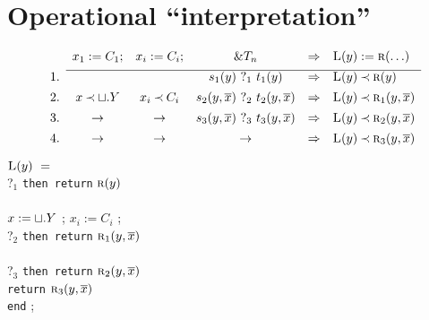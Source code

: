 \documentclass[leqno]{article}
\newcommand{\ky}[1]{{\tt #1}}
\newcommand{\ina}{\hspace*{1em}}
\newcommand{\inb}{\hspace*{2em}}
\newcommand{\inc}{\hspace*{3.5em}}
\newcommand{\func}[1]{\mbox{\sc #1}}
\newcommand{\f}[1]{\func{#1}}
\newcommand{\ret}{\mbox{$\ \rightarrow\ $}}
\begin{document}
\newpage\section{Operational ``interpretation''}
{\large{
\[\begin{array}{rccccl}
& x_1:=C_1; & x_i:=C_i; & \&T_n & \impl & \f L(y) := \f r(\ldots) \\[1ex] \cline{2-6}
1.&  & & s_1(y)\ \mbox{?}_1\ t_1(y) & \impl & \f L(y) \Incl \f r(y) \\[1ex]
2.& x\Incl\ch.Y &x_i\Incl C_i &s_2(y,\ovr x)\ \mbox{?}_2\ t_2(y,\ovr x) 
    &\impl &\f L(y)\Incl \f r_1(y,\ovr x)\\[1ex]
3.& \ret & \ret &s_3(y,\ovr x)\ \mbox{?}_3\ t_3(y,\ovr x)
    &\impl &\f L(y)\Incl \f r_2(y,\ovr x)\\[1ex]
4.& \ret & \ret & \ret &\impl &\f L(y)\Incl \f r_3(y,\ovr x) 
\end{array}
\] }}

\noindent
\hspace*{4em}
$\f L(y)\ =$ \\  \hspace*{4em}
\ina\ky{if} ?$_1$ \ky{then return} $\f r(y)$ \\  \hspace*{4em}
\ina\ky{else} \\  \hspace*{4em}
\inb $x:=\sqcup.Y$ ; \ina $x_i:= C_i$ ; \\  \hspace*{4em}
\inb\ky{if} ?$_2$ \ky{then return} $\f r_1(y,\ovr x)$ \\  \hspace*{4em}
\inb\ky{else} \\ \hspace*{4em}
 \inc\ky{if} ?$_3$ \ky{then return} $\f r_2(y,\ovr x)$ \\  \hspace*{4em}
 \inc\ky{else} \ky{return} $\f r_3(y,\ovr x)$ \\  \hspace*{4em}
\ky{end} ;
\end{document}

